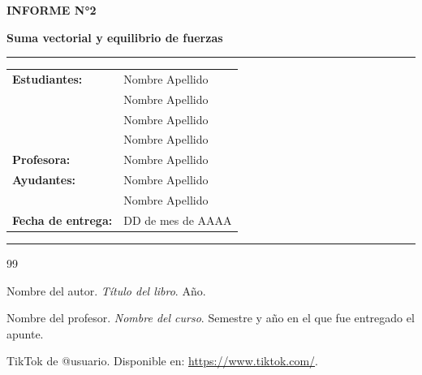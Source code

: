\documentclass[12pt,a4paper]{article}
\begin{document}
\begin{center}
{\Large\textbf{INFORME N°2}}

{\LARGE\textbf{Suma vectorial y equilibrio de fuerzas}}

\rule{\textwidth}{0.5pt}

\begin{tabular}{ll}
    \textbf{Estudiantes:} & Nombre Apellido \\
                          & Nombre Apellido \\
                          & Nombre Apellido \\
                          & Nombre Apellido \\[0.2cm]
    \textbf{Profesora:}   & Nombre Apellido \\
    \textbf{Ayudantes:}    & Nombre Apellido \\
                           & Nombre Apellido\\[0.2cm]
    \textbf{Fecha de entrega:} & DD de mes de AAAA
\end{tabular}

\vspace{0.4cm}
\rule{\textwidth}{0.5pt}

\end{center}



\newpage


\newpage


\newpage


\newpage




\begin{thebibliography}{99}

 Nombre del autor. \textit{Título del libro}. Año.

 Nombre del profesor. \textit{Nombre del curso}. Semestre y año en el que fue entregado el apunte.

 TikTok de @usuario. Disponible en: \url{https://www.tiktok.com/}.

\end{thebibliography}
\end{document}
